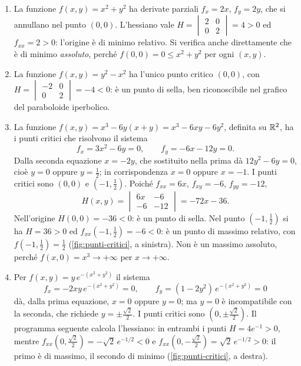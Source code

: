 \begin{esempio}\label{es:punti-critici}
\begin{enumerate}[label=\textup{(\alph*)}]
  \item La funzione $f(x,y)=x^{2}+y^{2}$ ha derivate parziali $f_{x}=2x$, $f_{y}=2y$, che si
  annullano nel punto $(0,0)$. L'hessiano vale
  $H=\begin{vmatrix}2&0\\0&2\end{vmatrix}=4>0$ ed $f_{xx}=2>0$: l'origine è di minimo
  relativo. Si verifica anche direttamente che è di minimo \emph{assoluto}, perché
  $f(0,0)=0\le x^{2}+y^{2}$ per ogni $(x,y)$.
  \item La funzione $f(x,y)=y^{2}-x^{2}$ ha l'unico punto critico $(0,0)$, con
  $H=\begin{vmatrix}-2&0\\0&2\end{vmatrix}=-4<0$: è un punto di sella, ben riconoscibile
  nel grafico del paraboloide iperbolico.
  \item La funzione $f(x,y)=x^{3}-6y(x+y)=x^{3}-6xy-6y^{2}$, definita su $\mathbb{R}^{2}$, ha i
  punti critici che risolvono il sistema
  \[
    f_{x}=3x^{2}-6y=0, \qquad f_{y}=-6x-12y=0 .
  \]
  Dalla seconda equazione $x=-2y$, che sostituito nella prima dà $12y^{2}-6y=0$, cioè
  $y=0$ oppure $y=\frac12$; in corrispondenza $x=0$ oppure $x=-1$. I punti critici sono
  $(0,0)$ e $(-1,\frac12)$. Poiché $f_{xx}=6x$, $f_{xy}=-6$, $f_{yy}=-12$,
  \[
    H(x,y)=\begin{vmatrix}6x&-6\\-6&-12\end{vmatrix}=-72x-36 .
  \]
  Nell'origine $H(0,0)=-36<0$: è un punto di sella. Nel punto $(-1,\frac12)$ si ha
  $H=36>0$ ed $f_{xx}(-1,\frac12)=-6<0$: è un punto di massimo relativo, con
  $f(-1,\frac12)=\frac12$ (\cref{fig:punti-critici}, a sinistra). Non è un massimo
  assoluto, perché $f(x,0)=x^{3}\to+\infty$ per $x\to+\infty$.
  \item Per $f(x,y)=y\,e^{-(x^{2}+y^{2})}$ il sistema
  \[
    f_{x}=-2xy\,e^{-(x^{2}+y^{2})}=0, \qquad f_{y}=(1-2y^{2})\,e^{-(x^{2}+y^{2})}=0
  \]
  dà, dalla prima equazione, $x=0$ oppure $y=0$; ma $y=0$ è incompatibile con la seconda,
  che richiede $y=\pm\frac{\sqrt2}2$. I punti critici sono $(0,\pm\frac{\sqrt2}2)$. Il
  programma seguente calcola l'hessiano: in entrambi i punti $H=4e^{-1}>0$, mentre
  $f_{xx}(0,\frac{\sqrt2}2)=-\sqrt2\,e^{-1/2}<0$ e $f_{xx}(0,-\frac{\sqrt2}2)=\sqrt2\,e^{-1/2}>0$:
  il primo è di massimo, il secondo di minimo (\cref{fig:punti-critici}, a destra).
\end{enumerate}
\end{esempio}

